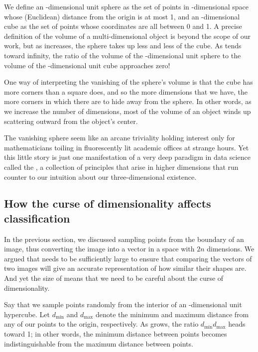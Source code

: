 We define an -dimensional unit sphere as the set of points in -dimensional space whose (Euclidean) distance from the origin is at most 1, and an -dimensional cube as the set of points whose coordinates are all between 0 and 1. A precise definition of the volume of a multi-dimensional object is beyond the scope of our work, but as  increases, the sphere takes up less and less of the cube. As  tends toward infinity, the ratio of the volume of the -dimensional unit sphere to the volume of the -dimensional unit cube approaches zero!

One way of interpreting the vanishing of the sphere's volume is that the cube has more corners than a square does, and so the more dimensions that we have, the more corners in which there are to hide away from the sphere. In other words, as we increase the number of dimensions, most of the volume of an object winds up scattering outward from the object's center.

The vanishing sphere seem like an arcane triviality holding interest only for mathematicians toiling in fluorescently lit academic offices at strange hours. Yet this little story is just one manifestation of a very deep paradigm in data science called the , a collection of principles that arise in higher dimensions that run counter to our intuition about our three-dimensional existence.

\FloatBarrier
{}
\subsection{How the curse of dimensionality affects classification}

In the previous section, we discussed sampling  points from the boundary of an image, thus converting the image into a vector in a space with $2n$ dimensions. We argued that  needs to be sufficiently large to ensure that comparing the vectors of two images will give an accurate representation of how similar their shapes are. And yet the size of  means that we need to be careful about the curse of dimensionality.

Say that we sample  points randomly from the interior of an -dimensional unit hypercube. Let $d_{\text{min}}$ and $d_{\text{max}}$ denote the minimum and maximum distance from any of our points to the origin, respectively. As  grows, the ratio $d_{\text{min}}d_{\text{max}}$ heads toward 1; in other words, the minimum distance between points becomes indistinguishable from the maximum distance between points.

